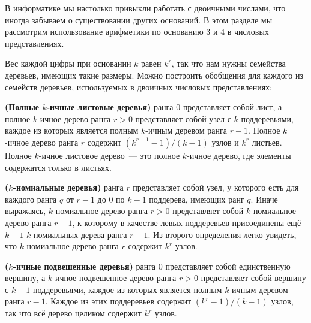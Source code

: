 \begin{frame}[fragile]{}


В информатике мы настолько привыкли работать с двоичными числами, что
иногда забываем о существовании других оснований. В этом разделе мы
рассмотрим использование арифметики по основанию 3 и 4 в числовых
представлениях.

Вес каждой цифры при основании $k$ равен $k^r$, так что нам нужны
семейства деревьев, имеющих такие размеры. Можно построить обобщения
для каждого из семейств деревьев, используемых в двоичных числовых
представлениях:

\begin{definition}\label{def:9.4}
  \textbf{(Полные $k$-ичные листовые деревья)}  ранга 0 представляет собой лист, а полное $k$-ичное
  дерево ранга $r > 0$ представляет собой узел с $k$ поддеревьями,
  каждое из которых является полным $k$-ичным деревом ранга
  $r-1$. Полное $k$-ичное дерево ранга $r$ содержит $(k^{r+1} - 1) /
  (k - 1)$ узлов и $k^r$ листьев. Полное $k$-ичное листовое дерево~---
  это полное $k$-ичное дерево, где элементы содержатся только в листьях.
\end{definition}
\begin{definition}\label{def:9.5}
  \textbf{($k$-номиальные деревья)}  ранга $r$ представляет собой узел, у
  которого есть для каждого ранга $q$ от $r-1$ до 0 по $k-1$
  поддерева, имеющих ранг $q$. Иначе выражаясь,
  $k$-номиальное дерево ранга $r > 0$ представляет собой
  $k$-номиальное дерево ранга $r-1$, к которому в качестве левых
  поддеревьев присоединены ещё $k-1$ $k$-номиальных дерева ранга
  $r-1$. Из второго определения легко увидеть, что $k$-номиальное
  дерево ранга $r$ содержит $k^r$ узлов.
\end{definition}

\begin{definition}\label{def:9.6}
  \textbf{($k$-ичные подвешенные деревья)}  ранга 0 представляет собой единственную
вершину, а $k$-ичное подвешенное дерево ранга $r > 0$ представляет
собой вершину с $k-1$ поддеревьями, каждое из которых является полным
$k$-ичным деревом ранга $r-1$. Каждое из этих поддеревьев содержит
$(k^r - 1) / (k - 1)$ узлов, так что всё дерево целиком содержит $k^r$ узлов.
\end{definition}


\end{frame}
